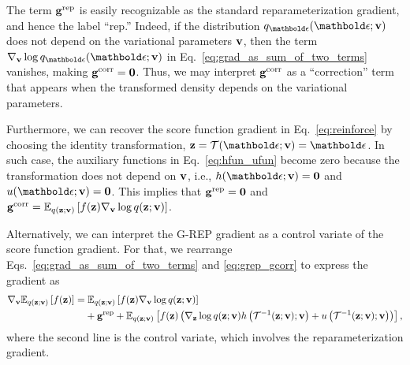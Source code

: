 \vspace*{-5pt}
The term $\mathbf{g}^{\textrm{rep}}$ is easily recognizable as the standard reparameterization gradient, and hence the label ``rep.'' Indeed, if the distribution $q_{\beps}(\beps;\bv)$ does not depend on the variational parameters $\mathbf{v}$, then the term $\nabla_{\bv} \log q_{\beps}(\beps;\bv)$ in Eq.~\ref{eq:grad_as_sum_of_two_terms} vanishes, making $\mathbf{g}^{\textrm{corr}}=\mathbf{0}$. Thus, we may interpret $\mathbf{g}^{\textrm{corr}}$ as a ``correction'' term that appears when the transformed density depends on the variational parameters.

Furthermore, we can recover the score function gradient in Eq.~\ref{eq:reinforce} by choosing the identity transformation, $\bz = \Tcal(\beps;\bv) = \beps$. In such case, the auxiliary functions in Eq.~\ref{eq:hfun_ufun} become zero because the transformation does not depend on $\mathbf{v}$, i.e., $\hfun(\beps;\bv)=\bzero$ and $\ufun(\beps;\bv)=\bzero$. This implies that $\mathbf{g}^{\textrm{rep}}=\mathbf{0}$ and $\mathbf{g}^{\textrm{corr}}=\mathbb{E}_{q(\mathbf{z};\mathbf{v})}\left[f(\mathbf{z})\nabla_{\mathbf{v}}\log q(\mathbf{z};\mathbf{v})\right]$.


Alternatively, we can interpret the \gls{G-REP} gradient as a control variate of the score function gradient. For that, we rearrange Eqs.~\ref{eq:grad_as_sum_of_two_terms} and \ref{eq:grep_gcorr} to express the gradient as
\begin{align}
	\nabla_{\mathbf{v}} \mathbb{E}_{q(\mathbf{z};\mathbf{v})}\left[f(\mathbf{z})\right] = & \; \mathbb{E}_{q(\mathbf{z};\mathbf{v})}\left[f(\mathbf{z}) \nabla_{\mathbf{v}}\log q(\mathbf{z};\mathbf{v})\right] \nonumber \\
	& + \mathbf{g}^{\textrm{rep}} + \mathbb{E}_{q(\mathbf{z};\mathbf{v})}\left[f(\mathbf{z}) \left(\nabla_{\mathbf{z}}\log q(\mathbf{z};\mathbf{v}) h\left(\mathcal{T}^{-1}(\mathbf{z};\mathbf{v});\mathbf{v}\right) + u\left(\mathcal{T}^{-1}(\mathbf{z};\mathbf{v});\mathbf{v} \right) \right)\right],\nonumber
\end{align}
where the second line is the control variate, which involves the reparameterization gradient.

